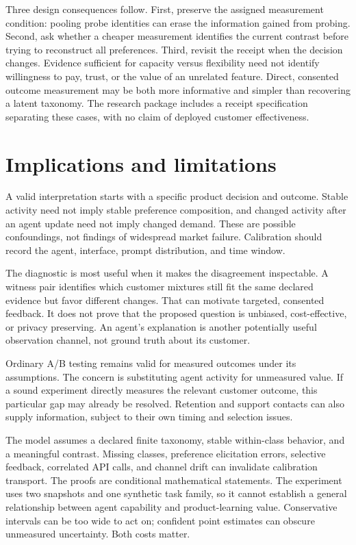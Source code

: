 \documentclass[10pt,twocolumn]{article}
\theoremstyle{definition}\newtheorem{definition}[theorem]{Definition}
\newcommand{\1}{\mathbf 1}
\begin{document}
Three design consequences follow. First, preserve the assigned measurement condition: pooling probe identities can erase the information gained from probing. Second, ask whether a cheaper measurement identifies the current contrast before trying to reconstruct all preferences. Third, revisit the receipt when the decision changes. Evidence sufficient for capacity versus flexibility need not identify willingness to pay, trust, or the value of an unrelated feature. Direct, consented outcome measurement may be both more informative and simpler than recovering a latent taxonomy. The research package includes a receipt specification separating these cases, with no claim of deployed customer effectiveness.

\section{Implications and limitations}
A valid interpretation starts with a specific product decision and outcome. Stable activity need not imply stable preference composition, and changed activity after an agent update need not imply changed demand. These are possible confoundings, not findings of widespread market failure. Calibration should record the agent, interface, prompt distribution, and time window.

The diagnostic is most useful when it makes the disagreement inspectable. A witness pair identifies which customer mixtures still fit the same declared evidence but favor different changes. That can motivate targeted, consented feedback. It does not prove that the proposed question is unbiased, cost-effective, or privacy preserving. An agent's explanation is another potentially useful observation channel, not ground truth about its customer.

Ordinary A/B testing remains valid for measured outcomes under its assumptions. The concern is substituting agent activity for unmeasured value. If a sound experiment directly measures the relevant customer outcome, this particular gap may already be resolved. Retention and support contacts can also supply information, subject to their own timing and selection issues.

The model assumes a declared finite taxonomy, stable within-class behavior, and a meaningful contrast. Missing classes, preference elicitation errors, selective feedback, correlated API calls, and channel drift can invalidate calibration transport. The proofs are conditional mathematical statements. The experiment uses two snapshots and one synthetic task family, so it cannot establish a general relationship between agent capability and product-learning value. Conservative intervals can be too wide to act on; confident point estimates can obscure unmeasured uncertainty. Both costs matter.
\end{document}
